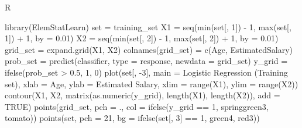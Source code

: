 \documentclass[
]{book}
\newenvironment{Shaded}{\begin{snugshade}}{\end{snugshade}}
\newcommand{\AttributeTok}[1]{\textcolor[rgb]{0.77,0.63,0.00}{#1}}
\newcommand{\ConstantTok}[1]{\textcolor[rgb]{0.00,0.00,0.00}{#1}}
\newcommand{\DecValTok}[1]{\textcolor[rgb]{0.00,0.00,0.81}{#1}}
\newcommand{\FloatTok}[1]{\textcolor[rgb]{0.00,0.00,0.81}{#1}}
\newcommand{\FunctionTok}[1]{\textcolor[rgb]{0.00,0.00,0.00}{#1}}
\newcommand{\NormalTok}[1]{#1}
\newcommand{\OtherTok}[1]{\textcolor[rgb]{0.56,0.35,0.01}{#1}}
\newcommand{\SpecialCharTok}[1]{\textcolor[rgb]{0.00,0.00,0.00}{#1}}
\newcommand{\StringTok}[1]{\textcolor[rgb]{0.31,0.60,0.02}{#1}}
\theoremstyle{definition}
\theoremstyle{definition}
\theoremstyle{definition}
\theoremstyle{definition}
\theoremstyle{remark}
\begin{document}
R

\begin{Shaded}
\begin{Highlighting}[]
\FunctionTok{library}\NormalTok{(ElemStatLearn)}
\NormalTok{set }\OtherTok{=}\NormalTok{ training\_set}
\NormalTok{X1 }\OtherTok{=} \FunctionTok{seq}\NormalTok{(}\FunctionTok{min}\NormalTok{(set[, }\DecValTok{1}\NormalTok{]) }\SpecialCharTok{{-}} \DecValTok{1}\NormalTok{, }\FunctionTok{max}\NormalTok{(set[, }\DecValTok{1}\NormalTok{]) }\SpecialCharTok{+} \DecValTok{1}\NormalTok{, }\AttributeTok{by =} \FloatTok{0.01}\NormalTok{)}
\NormalTok{X2 }\OtherTok{=} \FunctionTok{seq}\NormalTok{(}\FunctionTok{min}\NormalTok{(set[, }\DecValTok{2}\NormalTok{]) }\SpecialCharTok{{-}} \DecValTok{1}\NormalTok{, }\FunctionTok{max}\NormalTok{(set[, }\DecValTok{2}\NormalTok{]) }\SpecialCharTok{+} \DecValTok{1}\NormalTok{, }\AttributeTok{by =} \FloatTok{0.01}\NormalTok{)}
\NormalTok{grid\_set }\OtherTok{=} \FunctionTok{expand.grid}\NormalTok{(X1, X2)}
\FunctionTok{colnames}\NormalTok{(grid\_set) }\OtherTok{=} \FunctionTok{c}\NormalTok{(}\StringTok{\textquotesingle{}Age\textquotesingle{}}\NormalTok{, }\StringTok{\textquotesingle{}EstimatedSalary\textquotesingle{}}\NormalTok{)}
\NormalTok{prob\_set }\OtherTok{=} \FunctionTok{predict}\NormalTok{(classifier, }\AttributeTok{type =} \StringTok{\textquotesingle{}response\textquotesingle{}}\NormalTok{, }\AttributeTok{newdata =}\NormalTok{ grid\_set)}
\NormalTok{y\_grid }\OtherTok{=} \FunctionTok{ifelse}\NormalTok{(prob\_set }\SpecialCharTok{\textgreater{}} \FloatTok{0.5}\NormalTok{, }\DecValTok{1}\NormalTok{, }\DecValTok{0}\NormalTok{)}
\FunctionTok{plot}\NormalTok{(set[, }\SpecialCharTok{{-}}\DecValTok{3}\NormalTok{],}
     \AttributeTok{main =} \StringTok{\textquotesingle{}Logistic Regression (Training set)\textquotesingle{}}\NormalTok{,}
     \AttributeTok{xlab =} \StringTok{\textquotesingle{}Age\textquotesingle{}}\NormalTok{, }\AttributeTok{ylab =} \StringTok{\textquotesingle{}Estimated Salary\textquotesingle{}}\NormalTok{,}
     \AttributeTok{xlim =} \FunctionTok{range}\NormalTok{(X1), }\AttributeTok{ylim =} \FunctionTok{range}\NormalTok{(X2))}
\FunctionTok{contour}\NormalTok{(X1, X2, }\FunctionTok{matrix}\NormalTok{(}\FunctionTok{as.numeric}\NormalTok{(y\_grid), }\FunctionTok{length}\NormalTok{(X1), }\FunctionTok{length}\NormalTok{(X2)), }\AttributeTok{add =} \ConstantTok{TRUE}\NormalTok{)}
\FunctionTok{points}\NormalTok{(grid\_set, }\AttributeTok{pch =} \StringTok{\textquotesingle{}.\textquotesingle{}}\NormalTok{, }\AttributeTok{col =} \FunctionTok{ifelse}\NormalTok{(y\_grid }\SpecialCharTok{==} \DecValTok{1}\NormalTok{, }\StringTok{\textquotesingle{}springgreen3\textquotesingle{}}\NormalTok{, }\StringTok{\textquotesingle{}tomato\textquotesingle{}}\NormalTok{))}
\FunctionTok{points}\NormalTok{(set, }\AttributeTok{pch =} \DecValTok{21}\NormalTok{, }\AttributeTok{bg =} \FunctionTok{ifelse}\NormalTok{(set[, }\DecValTok{3}\NormalTok{] }\SpecialCharTok{==} \DecValTok{1}\NormalTok{, }\StringTok{\textquotesingle{}green4\textquotesingle{}}\NormalTok{, }\StringTok{\textquotesingle{}red3\textquotesingle{}}\NormalTok{))}
\end{Highlighting}
\end{Shaded}
\end{document}
